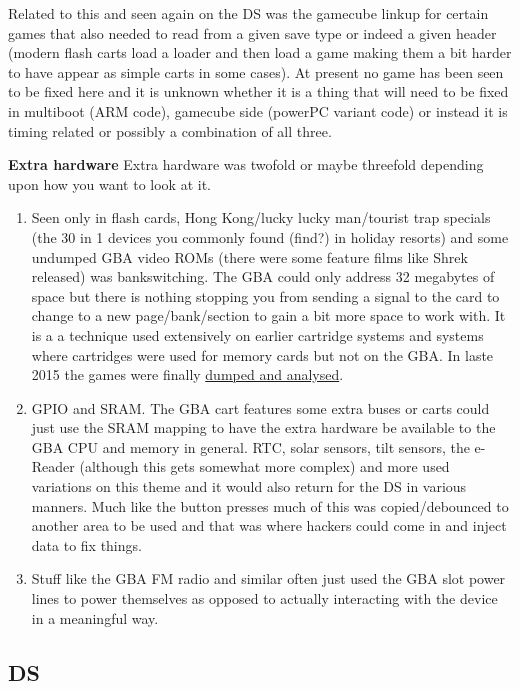 \documentclass[
]{book}
\providecommand{\tightlist}{%
  \setlength{\itemsep}{0pt}\setlength{\parskip}{0pt}}
\begin{document}
Related to this and seen again on the DS was the gamecube linkup for certain games that also needed to read from a given save type or indeed a given header (modern flash carts load a loader and then load a game making them a bit harder to have appear as simple carts in some cases). At present no game has been seen to be fixed here and it is unknown whether it is a thing that will need to be fixed in multiboot (ARM code), gamecube side (powerPC variant code) or instead it is timing related or possibly a combination of all three.

\textbf{Extra hardware} Extra hardware was twofold or maybe threefold depending upon how you want to look at it.

\begin{enumerate}
\def\labelenumi{\arabic{enumi}.}
\tightlist
\item
  Seen only in flash cards, Hong Kong/lucky lucky man/tourist trap specials (the 30 in 1 devices you commonly found (find?) in holiday resorts) and some undumped GBA video ROMs (there were some feature films like Shrek released) was bankswitching. The GBA could only address 32 megabytes of space but there is nothing stopping you from sending a signal to the card to change to a new page/bank/section to gain a bit more space to work with. It is a a technique used extensively on earlier cartridge systems and systems where cartridges were used for memory cards but not on the GBA. In laste 2015 the games were finally \href{https://mgba.io/2015/10/20/dumping-the-undumped/}{dumped and analysed}.
\item
  GPIO and SRAM. The GBA cart features some extra buses or carts could just use the SRAM mapping to have the extra hardware be available to the GBA CPU and memory in general. RTC, solar sensors, tilt sensors, the e-Reader (although this gets somewhat more complex) and more used variations on this theme and it would also return for the DS in various manners. Much like the button presses much of this was copied/debounced to another area to be used and that was where hackers could come in and inject data to fix things.
\item
  Stuff like the GBA FM radio and similar often just used the GBA slot power lines to power themselves as opposed to actually interacting with the device in a meaningful way.
\end{enumerate}

\hypertarget{ds-2}{%
\subsection{DS}\label{ds-2}}
\end{document}
